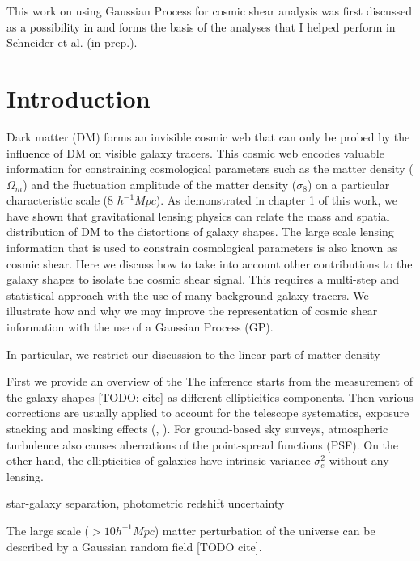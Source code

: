  
This work on using Gaussian Process for cosmic shear analysis 
was first discussed as a possibility in  \citep{Schneider2014}  and 
forms the basis of the analyses that I helped perform 
in Schneider et al. (in prep.). 

\section{Introduction} 
Dark matter (DM) forms an invisible cosmic web that can only be
probed by the influence of DM on visible galaxy tracers. 
This cosmic web encodes valuable information for constraining cosmological
parameters such as the matter density ($\Omega_m$) and the fluctuation amplitude 
of the matter density ($\sigma_8$) on a particular characteristic scale (8
$h^{-1} Mpc$). 
As demonstrated in chapter 1 of this work, we have shown that gravitational
lensing physics can relate the mass and spatial distribution of DM to the distortions
of galaxy shapes.  
The large scale lensing information that is used to constrain cosmological 
parameters is also known as cosmic shear. 
Here we discuss how to take into account other contributions to the galaxy shapes
to isolate the cosmic shear signal. 
This requires a multi-step and statistical approach with the use of many 
background galaxy tracers. We
illustrate how and why we may improve the representation of cosmic shear
information with the use of a Gaussian Process (GP). 

In particular, we restrict our discussion to the linear part of matter density  



First we provide an overview of the   
The inference starts from the measurement of the galaxy shapes [TODO: cite] as different
ellipticities components. Then various corrections are usually applied to 
account for the telescope systematics, exposure stacking and masking effects 
(\citealt{Rowe2010}, \citealt{Jee2013a}). For ground-based sky surveys,   
atmospheric turbulence also causes aberrations of the point-spread functions
(PSF). On the other hand, the ellipticities of galaxies have intrinsic
variance $\sigma_e^2$ without any lensing.    


star-galaxy separation, photometric redshift uncertainty  

The large scale ($> 10 h^{-1} Mpc$) matter perturbation of the universe can be  
described by a Gaussian random field [TODO cite].  




